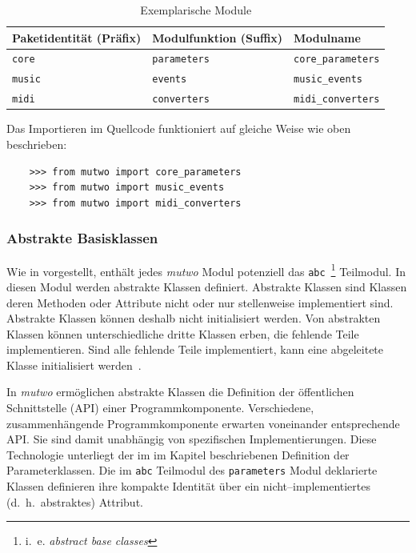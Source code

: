\documentclass[12pt,a4paper,ngerman]{article}
\begin{document}
\begin{table}[H]
    \begin{center}
        \begin{tabular}{l l l}
            \hline
            Paketidentität (Präfix) & Modulfunktion (Suffix) & Modulname \\ [0.5ex] 
            \hline\hline
            \texttt{core} & \texttt{parameters} & \texttt{core\_parameters} \\
            \texttt{music} & \texttt{events} & \texttt{music\_events} \\
            \texttt{midi} & \texttt{converters} & \texttt{midi\_converters} \\
            \hline
        \end{tabular}
    \end{center}

    \caption{Exemplarische Module}
\end{table}

Das Importieren im Quellcode funktioniert auf gleiche Weise wie oben beschrieben:

\begin{lstlisting}
    >>> from mutwo import core_parameters
    >>> from mutwo import music_events
    >>> from mutwo import midi_converters
\end{lstlisting}

\subsubsection{Abstrakte Basisklassen}
\label{abstractBaseClasses}

Wie in \emph{} vorgestellt, enthält jedes \emph{mutwo} Modul potenziell das \texttt{abc}~\footnote{%
    i.\ e. \emph{abstract base classes}%
} Teilmodul.
In diesen Modul werden abstrakte Klassen definiert.
Abstrakte Klassen sind Klassen deren Methoden oder Attribute nicht oder nur stellenweise implementiert sind.
Abstrakte Klassen können deshalb nicht initialisiert werden.
Von abstrakten Klassen können unterschiedliche dritte Klassen erben, die fehlende Teile implementieren.
Sind alle fehlende Teile implementiert, kann eine abgeleitete Klasse initialisiert werden~\parencite{abstractTypeWiki}.

\bigskip

In \emph{mutwo} ermöglichen abstrakte Klassen die Definition der öffentlichen Schnittstelle (API) einer Programmkomponente.
Verschiedene, zusammenhängende Programmkomponente erwarten voneinander entsprechende API.
Sie sind damit unabhängig von spezifischen Implementierungen.
Diese Technologie unterliegt der im im Kapitel \emph{} beschriebenen Definition der Parameterklassen.
Die im \texttt{abc} Teilmodul des \texttt{parameters} Modul deklarierte Klassen definieren ihre kompakte Identität über ein nicht--implementiertes (d.~h.\ abstraktes) Attribut.
\end{document}
